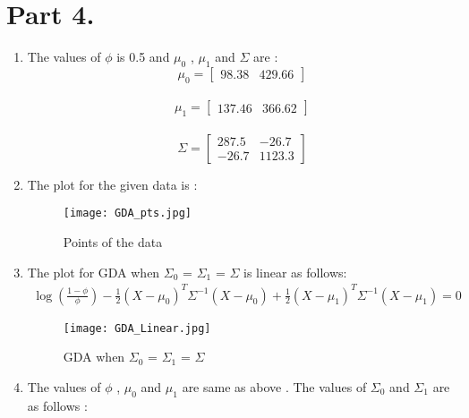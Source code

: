 \documentclass{article}
\begin{document}
\section{Part 4.}
\begin{enumerate}[label=(\alph*)]
   \item The values of $\phi$ is 0.5 and  $\mu _0$ , $\mu _1$ and $\Sigma $ are :\\
   
             \hspace{4cm} \[
            \mu _0 =
              \begin{bmatrix}
               98.38 & 429.66
              \end{bmatrix}
            \]
            \\
             \[
            \mu _1 =
              \begin{bmatrix}
               137.46 & 366.62
              \end{bmatrix}
            \]
            \\
             \[
           \Sigma =
              \begin{bmatrix}
               287.5 & -26.7 \\
               -26.7 & 1123.3
              \end{bmatrix}
            \]
    \item The plot for the given data is :
        \begin{figure}[H]
            \centering
            \texttt{[image: GDA\_pts.jpg]}
            \caption{Points of the data}
            \label{Linear_Reg_Cont_13}
         \end{figure}
            
    \item The plot for GDA when $\Sigma _0$ = $\Sigma _1$ = $\Sigma$ is linear as follows: 
        \begin{align*}
           \log(\frac{1-\phi}{\phi}) - \frac{1}{2}(X-\mu _0)^T\Sigma^{-1}(X-\mu _0) + \frac{1}{2}(X-\mu _1)^T\Sigma^{-1}(X-\mu _1) = 0
        \end{align*}  
    
        \begin{figure}[H]
            \centering
            \texttt{[image: GDA\_Linear.jpg]}
            \caption{GDA when $\Sigma _0$ = $\Sigma _1$ = $\Sigma$ }
            \label{Linear_Reg_Cont_13}
         \end{figure}
         
    \item The values of $\phi$ , $\mu _0$ and $\mu _1$ are same as above . The values of $\Sigma _0$ and $\Sigma _1$ are as follows :
    

\end{enumerate}
\end{document}
